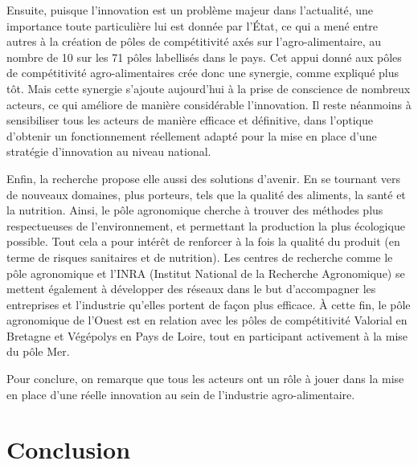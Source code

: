 \documentclass[a4paper,10pt]{report}
\begin{document}
			Ensuite, puisque l’innovation est un problème majeur dans l’actualité, une importance toute particulière lui est donnée par l’État, ce qui a mené entre autres à la création de pôles de compétitivité axés sur l’agro-alimentaire, au nombre de 10 sur les 71 pôles labellisés dans le pays. Cet appui donné aux pôles de compétitivité agro-alimentaires crée donc une synergie, comme expliqué plus tôt. Mais cette synergie s’ajoute aujourd’hui à la prise de conscience de nombreux acteurs, ce qui améliore de manière considérable l’innovation. Il reste néanmoins à sensibiliser tous les acteurs de manière efficace et définitive, dans l’optique d’obtenir un fonctionnement réellement adapté pour la mise en place d’une stratégie d’innovation au niveau national.

			Enfin, la recherche propose elle aussi des solutions d’avenir. En se tournant vers de nouveaux domaines, plus porteurs, tels que la qualité des aliments, la santé et la nutrition. Ainsi, le pôle agronomique cherche à trouver des méthodes plus respectueuses de l’environnement, et permettant la production la plus écologique possible. Tout cela a pour intérêt de renforcer à la fois la qualité du produit (en terme de risques sanitaires et de nutrition). Les centres de recherche comme le pôle agronomique et l’INRA (Institut National de la Recherche Agronomique) se mettent également à développer des réseaux dans le but d’accompagner les entreprises et l’industrie qu’elles portent de façon plus efficace. À cette fin, le pôle agronomique de l’Ouest est en relation avec les pôles de compétitivité Valorial en Bretagne et Végépolys en Pays de Loire, tout en participant activement à la mise du pôle Mer. 

  			 Pour conclure, on remarque que tous les acteurs ont un rôle à jouer dans la mise en place d’une réelle innovation au sein de l’industrie agro-alimentaire.

\chapter*{Conclusion}

{}

\end{document}

